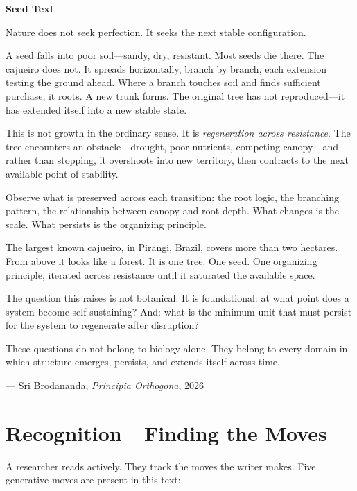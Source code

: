 \documentclass[11pt, twoside, openright]{book}
\theoremstyle{plain}
\theoremstyle{definition}
\newenvironment{seedbox}{%
  \begin{mdframed}[backgroundcolor=SeedBox,linecolor=PrincipiaDark!60,linewidth=0.5pt,innertopmargin=6pt,innerbottommargin=6pt]
  \noindent\textbf{Seed Text}\par\medskip}{\end{mdframed}}
\begin{document}
\begin{seedbox}
Nature does not seek perfection. It seeks the next stable configuration.

A seed falls into poor soil---sandy, dry, resistant. Most seeds die
there. The cajueiro does not. It spreads horizontally, branch by
branch, each extension testing the ground ahead. Where a branch
touches soil and finds sufficient purchase, it roots. A new trunk
forms. The original tree has not reproduced---it has extended itself
into a new stable state.

This is not growth in the ordinary sense. It is \textit{regeneration across
resistance}. The tree encounters an obstacle---drought, poor nutrients,
competing canopy---and rather than stopping, it overshoots into new
territory, then contracts to the next available point of stability.

Observe what is preserved across each transition: the root logic, the
branching pattern, the relationship between canopy and root depth.
What changes is the scale. What persists is the organizing principle.

The largest known cajueiro, in Pirangi, Brazil, covers more than two
hectares. From above it looks like a forest. It is one tree. One seed.
One organizing principle, iterated across resistance until it saturated
the available space.

The question this raises is not botanical. It is foundational: at what
point does a system become self-sustaining? And: what is the minimum
unit that must persist for the system to regenerate after disruption?

These questions do not belong to biology alone. They belong to every
domain in which structure emerges, persists, and extends itself across
time.

\medskip
\begin{flushright}
--- Sri Brodananda, \textit{Principia Orthogona}, 2026
\end{flushright}
\end{seedbox}

\section{Recognition---Finding the Moves}
A researcher reads actively. They track the moves the writer makes.
Five generative moves are present in this text:
\end{document}
